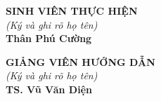 \documentclass[12pt,a4paper,oneside]{report}
\begin{document}
\noindent
\begin{minipage}[t]{0.48\textwidth}
    \begin{center}
        {\fontsize{13pt}{16pt}\selectfont \textbf{SINH VIÊN THỰC HIỆN}}\\[8pt]
        \textit{(Ký và ghi rõ họ tên)}\\[55pt]
        {\fontsize{13pt}{16pt}\selectfont \textbf{Thân Phú Cường}}
    \end{center}
\end{minipage}
\hfill
\begin{minipage}[t]{0.48\textwidth}
    \begin{center}
        {\fontsize{13pt}{16pt}\selectfont \textbf{GIẢNG VIÊN HƯỚNG DẪN}}\\[8pt]
        \textit{(Ký và ghi rõ họ tên)}\\[55pt]
        {\fontsize{13pt}{16pt}\selectfont \textbf{TS. Vũ Văn Diện}}
    \end{center}
\end{minipage}
\end{document}
